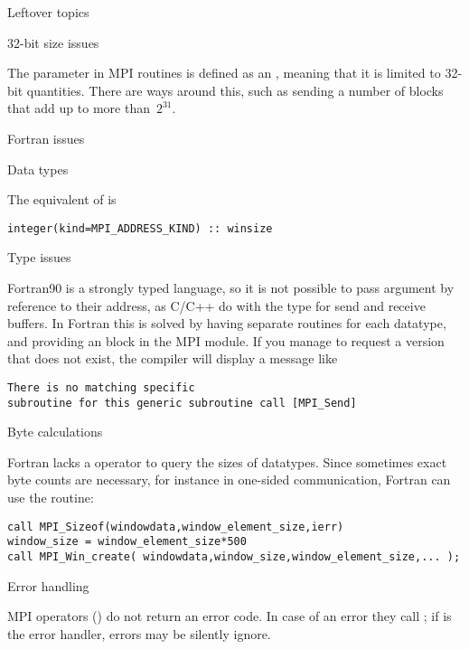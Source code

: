  {Leftover topics}

 {32-bit size issues}

The  parameter in MPI routines is defined as an ,
meaning that it is limited to 32-bit quantities.  There are ways
around this, such as sending a number of
 blocks that add up to more than~$2^{31}$.

 {Fortran issues}

 {Data types}

The equivalent of  is
\begin{verbatim}
integer(kind=MPI_ADDRESS_KIND) :: winsize
\end{verbatim}

 {Type issues}

Fortran90 is a strongly typed language, so it is not possible to pass
argument by reference to their address, as C/C++ do with the 
type for send and receive buffers. In Fortran this is solved by having
separate routines for each datatype, and providing an  block
in the MPI module. If you manage to request a version that does not exist,
the compiler will display a message like
\begin{verbatim}
There is no matching specific 
subroutine for this generic subroutine call [MPI_Send]
\end{verbatim}

 {Byte calculations}
\label{sec:f-sizeof}

Fortran lacks a  operator to query the sizes of datatypes.
Since sometimes exact byte counts are necessary,
for instance in one-sided communication,
Fortran can use the  routine:
\begin{verbatim}
call MPI_Sizeof(windowdata,window_element_size,ierr)
window_size = window_element_size*500
call MPI_Win_create( windowdata,window_size,window_element_size,... );
\end{verbatim}


 {Error handling}

MPI operators () do not return an error code. In case of
an error they call ; if 
is the error handler, errors may be silently ignore.

